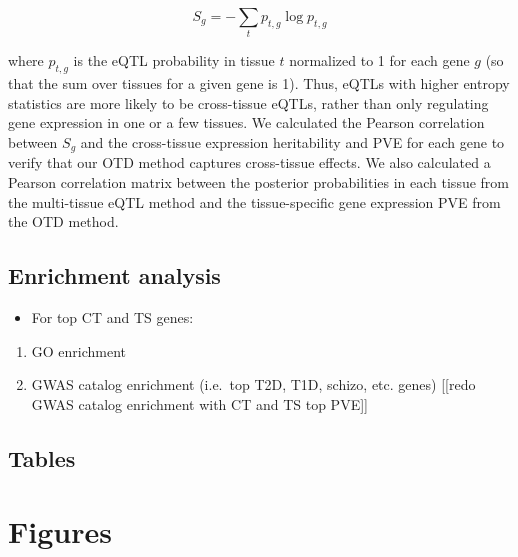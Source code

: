 \documentclass[]{article}
\renewcommand{\baselinestretch}{2}
\begin{document}
\[ S_g = -\sum_{t}p_{t,g} \log p_{t,g} \]

where \(p_{t,g}\) is the eQTL probability in tissue \(t\) normalized to
1 for each gene \(g\) (so that the sum over tissues for a given gene is 1). Thus, eQTLs with higher entropy statistics are
more likely to be cross-tissue eQTLs, rather than only regulating gene
expression in one or a few tissues. We calculated the Pearson
correlation between \(S_g\) and the cross-tissue expression heritability
and PVE for each gene to verify that our OTD method captures
cross-tissue effects. We also calculated a Pearson correlation matrix
between the posterior probabilities in each tissue from the multi-tissue
eQTL method and the tissue-specific gene expression PVE from the OTD
method.

\subsection{Enrichment analysis}\label{enrichment-analysis}

\begin{itemize}
\itemsep1pt\parskip0pt
\item
  For top CT and TS genes:
\end{itemize}

\begin{enumerate}
\def\labelenumi{\arabic{enumi}.}
\itemsep1pt\parskip0pt
\item
  GO enrichment
\item
  GWAS catalog enrichment (i.e.~top T2D, T1D, schizo, etc. genes)
  {[}{[}redo GWAS catalog enrichment with CT and TS top PVE{]}{]}
\end{enumerate}

\renewcommand{\baselinestretch}{1} 

\subsection{Tables}\label{tables}

\section{Figures}\label{figures}
\end{document}
